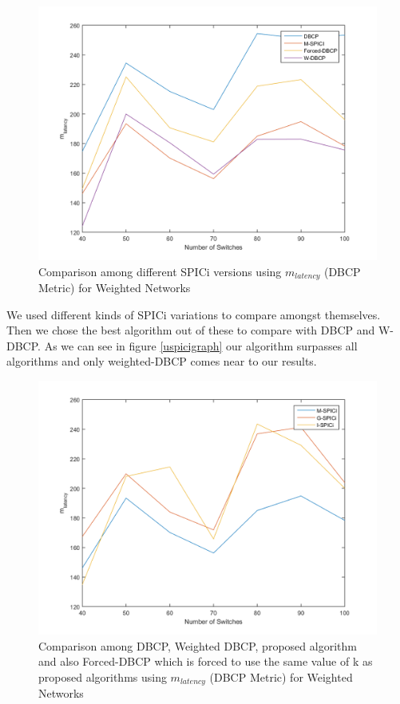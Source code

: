 \documentclass[10pt]{extarticle}
\begin{document}
	\begin{figure}
		\includegraphics[width=\linewidth]{wnewspici.png}
		\caption{Comparison among different SPICi versions using $m_{latency}$ (DBCP Metric) for Weighted Networks}
		\label{fig:uspicigraph}
	\end{figure}

	We used different kinds of SPICi variations to compare amongst themselves. Then we chose the best algorithm out of these to compare with DBCP and W-DBCP. As we can see in figure \ref{uspicigraph} our algorithm surpasses all algorithms and only weighted-DBCP comes near to our results.

	
	\begin{figure}
		\includegraphics[width=\linewidth]{wnewgraph.png}
		\caption{Comparison among DBCP, Weighted DBCP, proposed algorithm and also Forced-DBCP which is forced to use the same value of k as proposed algorithms using $m_{latency}$ (DBCP Metric) for Weighted Networks}
		\label{fig:newgraph}
	\end{figure}
	
\end{document}
